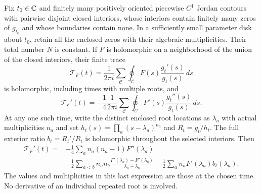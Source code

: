 \begin{hdttheorem}
\label{hdt:thm:collision-trace}
Fix $t_0\in\mathbb C$ and finitely many positively oriented piecewise
$C^1$ Jordan contours with pairwise disjoint closed interiors,
whose interiors contain finitely many zeros of $g_{t_0}$ and
whose boundaries contain none. In a sufficiently
small parameter disk about $t_0$, retain all the enclosed zeros
with their algebraic multiplicities. Their total number $N$ is
constant. If $F$ is holomorphic on a neighborhood of the union
of the closed interiors, their finite trace
\begin{equation}\label{hdt:eq:contour-trace}
\mathscr T_F(t)=\frac1{2\pi i}\sum_{\mathcal C}
\oint_{\mathcal C}F(s)\frac{g_t'(s)}{g_t(s)}\,ds
\end{equation}
is holomorphic, including times with multiple roots, and
\begin{equation}\label{hdt:eq:contour-trace-derivative}
\mathscr T_F'(t)=-\frac14\frac1{2\pi i}
\sum_{\mathcal C}\oint_{\mathcal C}
F'(s)\frac{g_t''(s)}{g_t(s)}\,ds.
\end{equation}
At any one such time, write the distinct enclosed root locations
as $\lambda_a$ with actual multiplicities $n_a$ and set
$h_t(s)=\prod_a(s-\lambda_a)^{n_a}$ and $R_t=g_t/h_t$.
The full exterior ratio $b_t=R_t'/R_t$ is holomorphic throughout
the selected interiors. Then
\begin{equation}\label{hdt:eq:multiple-trace}
\begin{split}
\mathscr T_F'(t)={}&-\frac14\sum_a n_a(n_a-1)F''(\lambda_a)\\
&-\frac12\sum_{a<b}n_an_b
\frac{F'(\lambda_a)-F'(\lambda_b)}{\lambda_a-\lambda_b}
-\frac12\sum_a n_aF'(\lambda_a)b_t(\lambda_a).
\end{split}
\end{equation}
The values and multiplicities in this last expression are those
at the chosen time. No derivative of an individual repeated root
is involved.
\end{hdttheorem}
